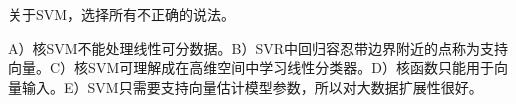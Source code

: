 关于SVM，选择所有不正确的说法。


A）核SVM不能处理线性可分数据。B）SVR中回归容忍带边界附近的点称为支持向量。C）核SVM可理解成在高维空间中学习线性分类器。D）核函数只能用于向量输入。E）SVM只需要支持向量估计模型参数，所以对大数据扩展性很好。
